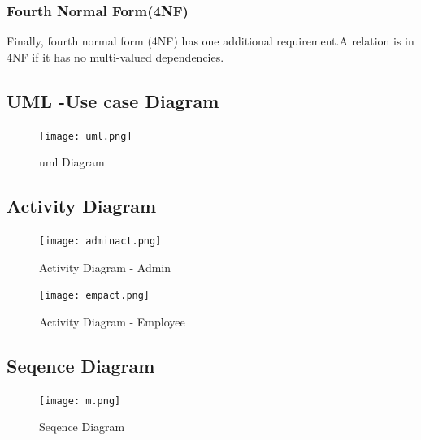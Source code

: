 \documentclass[a4paper,12pt]{article}
\begin{document}
\subsubsection{Fourth Normal Form(4NF)}
Finally, fourth normal form (4NF) has one additional requirement.A relation is in 4NF if it has no multi-valued dependencies.\\
\newpage
\subsection{UML -Use case Diagram}\vspace{2mm}
\begin{figure}[h!]
\centering
\texttt{[image: uml.png]}
\caption{uml Diagram}
\end{figure}

\newpage
\subsection{Activity Diagram}\vspace{2mm}
\begin{figure}[h!]
\centering
\texttt{[image: adminact.png]}
\caption{Activity Diagram - Admin}
\end{figure}
\newpage
\begin{figure}[h!]
\centering
\texttt{[image: empact.png]}
\caption{Activity Diagram - Employee}
\end{figure}

\newpage
\subsection{Seqence Diagram}\vspace{2mm}
\begin{figure}[h!]
\centering
\texttt{[image: m.png]}
\caption{Seqence Diagram}
\end{figure}
\newpage
\end{document}
